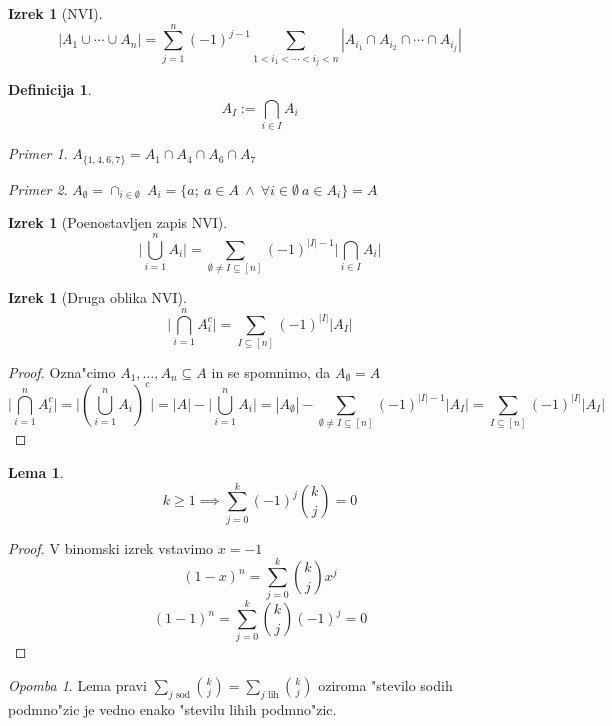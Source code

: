 \documentclass[a4paper,12pt]{article}
\theoremstyle{definition}
\newtheorem{defn}[counter]{Definicija}
\newtheorem{lemma}[counter]{Lema}
\newtheorem{theorem}[counter]{Izrek}
\theoremstyle{remark}
\newtheorem*{ex}{Primer}
\newtheorem*{rem}{Opomba}
\begin{document}
\begin{theorem}[NVI]
	\[|A_1 \cup \cdots \cup A_n| = \sum_{j = 1}^{n} (-1)^{j - 1} \sum_{1 < i_1 < \cdots < i_j < n}|A_{i_1} \cap A_{i_2} \cap \cdots \cap A_{i_j}|\]
\end{theorem}
\begin{defn}
	\[A_I := \displaystyle \bigcap_{i \in I} A_i \]
\end{defn}
\begin{ex}
	$A_{\{1,4,6,7\}} = A_1 \cap A_4 \cap A_6 \cap A_7$
\end{ex}
\begin{ex}
	$A_{\emptyset} = \cap_{i \in \emptyset} \ A_i = \{a; \ a \in A \ \land \ \forall i \in \emptyset\ a \in A_i \} = A$
\end{ex}
\begin{theorem}[Poenostavljen zapis NVI]
	\[\bigg|\bigcup_{i = 1}^{n} A_i\bigg| = \sum_{\emptyset \neq I \subseteq [n]} (-1)^{|I| - 1} \bigg|\bigcap_{i \in I}A_i\bigg|\]
\end{theorem}
\begin{theorem}[Druga oblika NVI]
	\[\bigg|\bigcap_{i = 1}^n A_i^c\bigg|  = \sum_{I \subseteq [n]} (-1)^{|I|} |A_I|\]
\end{theorem}
\begin{proof}
	Ozna"cimo $A_1, \ldots, A_n \subseteq A$ in se spomnimo, da $A_\emptyset = A$
	\[
		\bigg|\bigcap_{i = 1}^n A_i^c\bigg| =
		\bigg|(\bigcup_{i = 1}^n A_i)^c\bigg| =
		|A| - \bigg|\bigcup_{i = 1}^n A_i\bigg| =
		|A_{\emptyset}| - \sum_{\emptyset \neq I \subseteq [n]} (-1)^{|I|-1} |A_I| =
		\sum_{I \subseteq [n]} (-1)^{|I|} |A_I|
	\]
\end{proof}


\begin{lemma}
\[k \geqslant 1 \implies \sum_{j = 0}^k (-1)^j \binom{k}{j} = 0\]
\end{lemma}

\begin{proof}
	V binomski izrek vstavimo $x = -1$
	\[(1 -x)^n = \sum_{j = 0}^k \binom{k}{j} x^j \]
	\[(1 -1)^n = \sum_{j = 0}^k \binom{k}{j} (-1)^j = 0\]
\end{proof}

\begin{rem}
	Lema pravi $\sum_{j \text{ sod}} \binom{k}{j} = \sum_{j\text{ lih}} \binom{k}{j}$ oziroma "stevilo sodih podmno"zic je vedno enako "stevilu lihih podmno"zic.
\end{rem}
\end{document}
